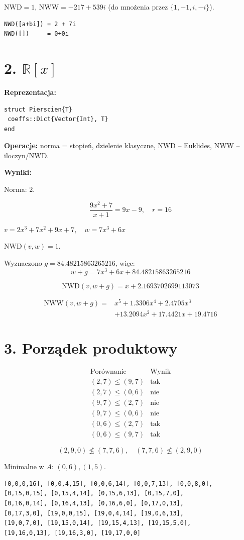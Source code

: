 \documentclass[11pt,a4paper]{article} %
\begin{document}
NWD$=1$, NWW$=-217+539i$ (do mnożenia przez $\{1,-1,i,-i\}$).

{\footnotesize
\begin{lstlisting}
NWD([a+bi]) = 2 + 7i
NWD([])     = 0+0i
\end{lstlisting}
}

\section*{2. $\mathbb{R}[x]$}

\textbf{Reprezentacja:}
{\footnotesize
\begin{lstlisting}
struct Pierscien{T}
 coeffs::Dict{Vector{Int}, T}
end
\end{lstlisting}
}

\textbf{Operacje:} norma = stopień, dzielenie klasyczne, NWD – Euklides, NWW – iloczyn/NWD.

\textbf{Wyniki:}

Norma: $2$.

\[
\frac{9x^2+7}{x+1}=9x-9,\quad r=16
\]

$v=2x^3+7x^2+9x+7,\quad w=7x^3+6x$

NWD$(v,w)=1$.

Wyznaczono $g=84.48215863265216$, więc:
\[
w+g=7x^3+6x+84.48215863265216
\]

\[
\mathrm{NWD}(v,w+g)=x+2.1693702699113073
\]

{\small
\begin{align*}
\mathrm{NWW}(v,w+g)= {} & x^5+1.3306x^4+2.4705x^3\\
&+13.2094x^2+17.4421x+19.4716
\end{align*}
}

\section*{3. Porządek produktowy}

\[
\begin{array}{c|c}
\text{Porównanie} & \text{Wynik} \\\hline
(2,7)\le(9,7) & \text{tak}\\
(2,7)\le(0,6) & \text{nie}\\
(9,7)\le(2,7) & \text{nie}\\
(9,7)\le(0,6) & \text{nie}\\
(0,6)\le(2,7) & \text{tak}\\
(0,6)\le(9,7) & \text{tak}
\end{array}
\]

\[
(2,9,0)\not\le(7,7,6),\quad (7,7,6)\not\le(2,9,0)
\]

Minimalne w $A$: $(0,6), (1,5)$.

{\scriptsize
\begin{lstlisting}
[0,0,0,16], [0,0,4,15], [0,0,6,14], [0,0,7,13], [0,0,8,0],
[0,15,0,15], [0,15,4,14], [0,15,6,13], [0,15,7,0],
[0,16,0,14], [0,16,4,13], [0,16,6,0], [0,17,0,13],
[0,17,3,0], [19,0,0,15], [19,0,4,14], [19,0,6,13],
[19,0,7,0], [19,15,0,14], [19,15,4,13], [19,15,5,0],
[19,16,0,13], [19,16,3,0], [19,17,0,0]
\end{lstlisting}
}
\end{document}
